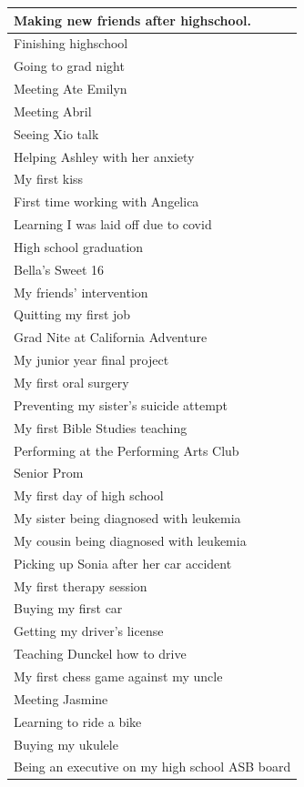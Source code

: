 \documentclass[
  .7em,
  letterpaper,
  DIV=11,
  numbers=noendperiod]{scrartcl}
\begin{document}
\begin{table}
\begin{tabular}{l}
\hline
Making new friends after highschool.\\
\hline
Finishing highschool\\
\hline
Going to grad night\\
\hline
Meeting Ate Emilyn\\
\hline
Meeting Abril\\
\hline
Seeing Xio talk\\
\hline
Helping Ashley with her anxiety\\
\hline
My first kiss\\
\hline
First time working with Angelica\\
\hline
Learning I was laid off due to covid\\
\hline
High school graduation\\
\hline
Bella's Sweet 16\\
\hline
My friends' intervention\\
\hline
Quitting my first job\\
\hline
Grad Nite at California Adventure\\
\hline
My junior year final project\\
\hline
My first oral surgery\\
\hline
Preventing my sister's suicide attempt\\
\hline
My first Bible Studies teaching\\
\hline
Performing at the Performing Arts Club\\
\hline
Senior Prom\\
\hline
My first day of high school\\
\hline
My sister being diagnosed with leukemia\\
\hline
My cousin being diagnosed with leukemia\\
\hline
Picking up Sonia after her car accident\\
\hline
My first therapy session\\
\hline
Buying my first car\\
\hline
Getting my driver's license\\
\hline
Teaching Dunckel how to drive\\
\hline
My first chess game against my uncle\\
\hline
Meeting Jasmine\\
\hline
Learning to ride a bike\\
\hline
Buying my ukulele\\
\hline
Being an executive on my high school ASB board\\
\hline

\end{tabular}
\end{table}
\end{document}

